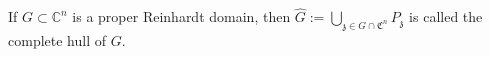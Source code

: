 If $G \subset \mathbb{C}^n$ is a proper Reinhardt domain, then $\hat{G} := \bigcup_{\mathfrak{z} \in G \cap \mathfrak{C}^n} P_{\mathfrak{z}}$ is called the complete hull of $G$.
